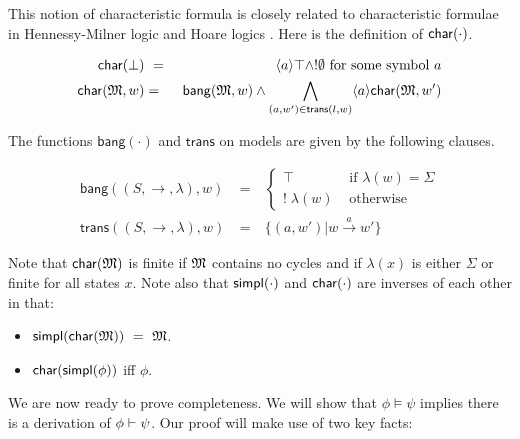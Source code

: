 
\NI This notion of characteristic formula is closely related to
characteristic formulae in Hennessy-Milner logic
\cite{AcetoL:chaforfata} and Hoare logics
\cite{HondaK:descriptive,ChargueraudA:provertcf}. Here is the
definition of $\mathsf{char}(\cdot)$.

\begin{eqnarray*}
  \mathsf{char}(\bot) &\ =\ & \langle a \rangle \top \land ! \emptyset  \mbox{ for some symbol }a  \\
  \mathsf{char}(\frak{M}, w) & = & \mathsf{bang}(\frak{M},w) \land \bigwedge_{(a,w') \in \mathsf{trans}(l,w)} \langle a \rangle \mathsf{char}(\frak{M}, w')  
\end{eqnarray*}


\NI The functions $\mathsf{bang}(\cdot)$ and $\mathsf{trans}$ on
models are given by the following clauses.

\begin{eqnarray*}
  \mathsf{bang}((S,\rightarrow,\lambda),w) 
     & \ = \ & 
  \begin{cases}
    \top & \mbox{ if } \lambda(w) = \Sigma  \\
    ! \; \lambda(w) & \mbox{ otherwise }  
  \end{cases} \\
  \mathsf{trans}((S,\rightarrow, \lambda),w) & \ = \ & \{(a,w') | w \xrightarrow{a} w' \} 
\end{eqnarray*}

\NI Note that $\mathsf{char}(\frak{M})$ is finite if $\frak{M}$ contains no cycles and if
$\lambda(x)$ is either $\Sigma$ or finite for all states $x$.
Note also that $\mathsf{simpl}(\cdot)$ and $\mathsf{char}(\cdot)$ are inverses of each other in that:

\begin{itemize}

\item $\mathsf{simpl}(\mathsf{char}(\frak{M})) \ = \  \frak{M}$. 

\item $\mathsf{char}(\mathsf{simpl}(\phi))$ iff $\phi$.

\end{itemize}

\NI We are now ready to prove completeness.  We will show that $\phi
\models \psi$ implies there is a derivation of $\phi \vdash \psi$.  Our proof
will make use of two key facts:

